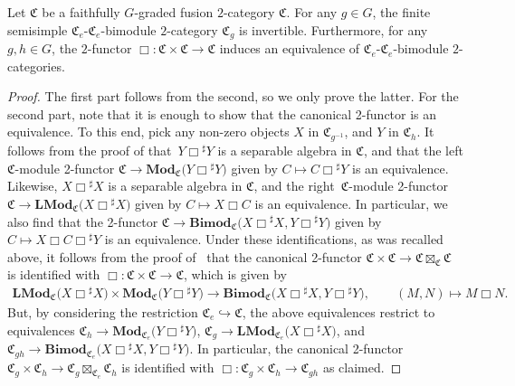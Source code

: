 \begin{Proposition}\label{prop:gradedMoritaequivalence}
Let $\mathfrak{C}$ be a faithfully $G$-graded fusion $2$-category $\mathfrak{C}$. For any $g\in G$, the finite semisimple $\mathfrak{C}_e$-$\mathfrak{C}_e$-bimodule $2$-category $\mathfrak{C}_g$ is invertible. Furthermore, for any $g,h\in G$, the $2$-functor $\Box\colon\mathfrak{C}\times\mathfrak{C}\rightarrow \mathfrak{C}$ induces an equivalence  of $\mathfrak{C}_e$-$\mathfrak{C}_e$-bimodule $2$-categories.
\end{Proposition}
\begin{proof}
The first part follows from the second, so we only prove the latter. For the second part, note that it is enough to show that the canonical 2-functor is an equivalence. To this end, pick any non-zero objects $X$ in $\mathfrak{C}_{g^{-1}}$, and $Y$ in $\mathfrak{C}_{h}$. It follows from the proof of \cite[Theorem~5.4.3]{D8} that~$Y\Box {^{\sharp}Y}$ is a separable algebra in $\mathfrak{C}$, and that the left $\mathfrak{C}$-module 2-functor $\mathfrak{C}\rightarrow \mathbf{Mod}_{\mathfrak{C}}\big(Y\Box {^{\sharp}Y}\big)$ given by $C\mapsto C\Box {^{\sharp}Y}$ is an equivalence. Likewise, $X\Box {^{\sharp}X}$ is a separable algebra in $\mathfrak{C}$, and the right~$\mathfrak{C}$-module 2-functor $\mathfrak{C}\rightarrow \mathbf{LMod}_{\mathfrak{C}}\big(X\Box {^{\sharp}X}\big)$ given by $C\mapsto X\Box C$ is an equivalence. In particular, we also find that the 2-functor $\mathfrak{C}\rightarrow \mathbf{Bimod}_{\mathfrak{C}}\big(X\Box {^{\sharp}X},Y\Box {^{\sharp}Y}\big)$ given by $C\mapsto X\Box C\Box {^{\sharp}Y}$ is an equivalence. Under these identifications, as was recalled above, it follows from the proof of~\cite[Theorem~2.2.4]{D10} that the canonical 2-functor $\mathfrak{C}\times\mathfrak{C}\rightarrow\mathfrak{C}\boxtimes_{\mathfrak{C}}\mathfrak{C}$ is identified with $\Box\colon\mathfrak{C}\times\mathfrak{C}\rightarrow \mathfrak{C}$, which is given by
\begin{gather*}
 \mathbf{LMod}_{\mathfrak{C}}\big(X\Box {^{\sharp}X}\big)\times\mathbf{Mod}_{\mathfrak{C}}\big(Y\Box {^{\sharp}Y}\big) \rightarrow \mathbf{Bimod}_{\mathfrak{C}}\big(X\Box {^{\sharp}X},Y\Box {^{\sharp}Y}\big),\qquad
(M,N) \mapsto M\Box N.
\end{gather*}
 But, by considering the restriction $\mathfrak{C}_e\hookrightarrow\mathfrak{C}$, the above equivalences restrict to equivalences $\mathfrak{C}_h\rightarrow \mathbf{Mod}_{\mathfrak{C}_e}\big(Y\Box {^{\sharp}Y}\big)$, $\mathfrak{C}_g\rightarrow \mathbf{LMod}_{\mathfrak{C}_e}\big(X\Box {^{\sharp}X}\big)$, and $\mathfrak{C}_{gh}\rightarrow \mathbf{Bimod}_{\mathfrak{C}_e}\big(X\Box {^{\sharp}X},Y\Box {^{\sharp}Y}\big)$. In particular, the canonical 2-functor $\mathfrak{C}_g\times\mathfrak{C}_h\rightarrow\mathfrak{C}_g\boxtimes_{\mathfrak{C}_e}\mathfrak{C}_h$ is identified with $\Box:\mathfrak{C}_g\times\mathfrak{C}_h\rightarrow\mathfrak{C}_{gh}$ as claimed.
\end{proof}

